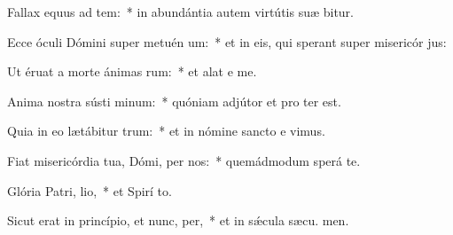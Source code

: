 \item Fallax equus ad tem:~* in abundántia autem virtútis suæ  bitur.
\item Ecce óculi Dómini super metuén um:~* et in eis, qui sperant super misericór jus:
\item Ut éruat a morte ánimas rum:~* et alat e  me.
\item Anima nostra sústi minum:~* quóniam adjútor et pro ter est.
\item Quia in eo lætábitur  trum:~* et in nómine sancto e vimus.
\item Fiat misericórdia tua, Dómi, per nos:~* quemádmodum sperá  te.
\item Glória Patri,  lio,~* et Spirí to.
\item Sicut erat in princípio, et nunc,  per,~* et in sǽcula sæcu. men.
